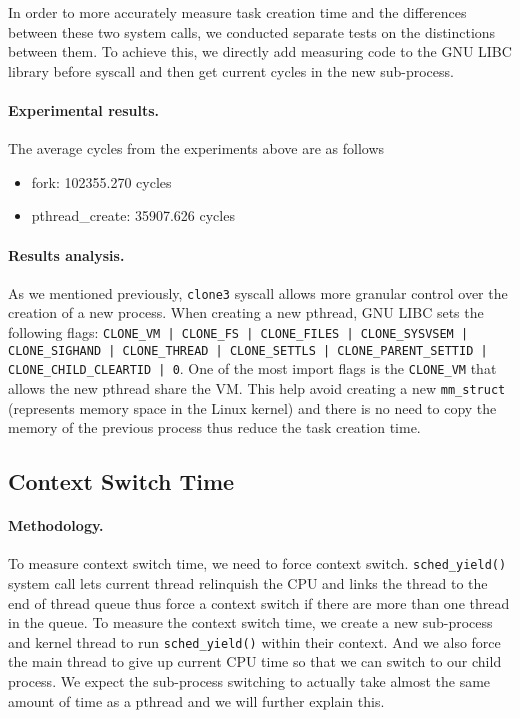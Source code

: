In order to more accurately measure task creation time and the differences between these two system calls, we conducted separate tests on the distinctions between them. To achieve this, we directly add measuring code to the GNU LIBC library before syscall and then get current cycles in the new sub-process. 

\paragraph{Experimental results.}
The average cycles from the experiments above are as follows
\begin{itemize}[leftmargin=*]
	\item fork: 102355.270 cycles
	\item pthread\_create: 35907.626 cycles
\end{itemize}

\paragraph{Results analysis.} As we mentioned previously, \texttt{clone3} syscall allows more granular control over the creation of a new process. When creating a new pthread, GNU LIBC sets the following flags: \texttt{CLONE\_VM | CLONE\_FS | CLONE\_FILES | CLONE\_SYSVSEM | CLONE\_SIGHAND | CLONE\_THREAD | CLONE\_SETTLS | CLONE\_PARENT\_SETTID | CLONE\_CHILD\_CLEARTID | 0}. One of the most import flags is the \texttt{CLONE\_VM} that allows the new pthread share the VM. This help avoid creating a new \texttt{mm\_struct} (represents memory space in the Linux kernel) and there is no need to copy the memory of the previous process thus reduce the task creation time.

\subsection{Context Switch Time}
\paragraph{Methodology.} To measure context switch time, we need to force context switch. \texttt{sched\_yield()} system call lets current thread relinquish the CPU and links the thread to the end of thread queue thus force a context switch if there are more than one thread in the queue. To measure the context switch time, we create a new sub-process and kernel thread to run \texttt{sched\_yield()} within their context. And we also force the main thread to give up current CPU time so that we can switch to our child process. We expect the sub-process switching to actually take almost the same amount of time as a pthread and we will further explain this.

